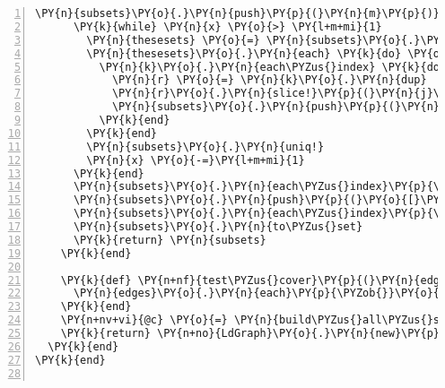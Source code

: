 \begin{Verbatim}[commandchars=\\\{\},numbers=left,firstnumber=1,stepnumber=1,xleftmargin=7mm, fontsize=\small]
      \PY{n}{subsets}\PY{o}{.}\PY{n}{push}\PY{p}{(}\PY{n}{m}\PY{p}{)}
      \PY{k}{while} \PY{n}{x} \PY{o}{>} \PY{l+m+mi}{1}
        \PY{n}{thesesets} \PY{o}{=} \PY{n}{subsets}\PY{o}{.}\PY{n}{select}\PY{p}{\PYZob{}}\PY{o}{|}\PY{n}{k}\PY{o}{|} \PY{n}{k}\PY{o}{.}\PY{n}{length} \PY{o}{==} \PY{n}{x}\PY{p}{\PYZcb{}}
        \PY{n}{thesesets}\PY{o}{.}\PY{n}{each} \PY{k}{do} \PY{o}{|}\PY{n}{k}\PY{o}{|}
          \PY{n}{k}\PY{o}{.}\PY{n}{each\PYZus{}index} \PY{k}{do} \PY{o}{|}\PY{n}{j}\PY{o}{|}
            \PY{n}{r} \PY{o}{=} \PY{n}{k}\PY{o}{.}\PY{n}{dup}
            \PY{n}{r}\PY{o}{.}\PY{n}{slice!}\PY{p}{(}\PY{n}{j}\PY{p}{)}
            \PY{n}{subsets}\PY{o}{.}\PY{n}{push}\PY{p}{(}\PY{n}{r}\PY{p}{)}
          \PY{k}{end}
        \PY{k}{end}
        \PY{n}{subsets}\PY{o}{.}\PY{n}{uniq!}
        \PY{n}{x} \PY{o}{-=}\PY{l+m+mi}{1}
      \PY{k}{end}
      \PY{n}{subsets}\PY{o}{.}\PY{n}{each\PYZus{}index}\PY{p}{\PYZob{}}\PY{o}{|}\PY{n}{k}\PY{o}{|} \PY{k}{if} \PY{n}{k}\PY{o}{>}\PY{l+m+mi}{1} \PY{k}{then} \PY{n}{subsets}\PY{o}{[}\PY{n}{k}\PY{o}{]}\PY{o}{.}\PY{n}{push}\PY{p}{(}\PY{n+nv+vi}{@id}\PY{p}{)} \PY{k}{end}\PY{p}{\PYZcb{}}
      \PY{n}{subsets}\PY{o}{.}\PY{n}{push}\PY{p}{(}\PY{o}{[}\PY{n+nv+vi}{@id}\PY{o}{]}\PY{p}{)}
      \PY{n}{subsets}\PY{o}{.}\PY{n}{each\PYZus{}index}\PY{p}{\PYZob{}}\PY{o}{|}\PY{n}{k}\PY{o}{|} \PY{n}{subsets}\PY{o}{[}\PY{n}{k}\PY{o}{]} \PY{o}{=} \PY{n}{subsets}\PY{o}{[}\PY{n}{k}\PY{o}{]}\PY{o}{.}\PY{n}{to\PYZus{}set}\PY{p}{\PYZcb{}}
      \PY{n}{subsets}\PY{o}{.}\PY{n}{to\PYZus{}set}
      \PY{k}{return} \PY{n}{subsets}
    \PY{k}{end}
    
    \PY{k}{def} \PY{n+nf}{test\PYZus{}cover}\PY{p}{(}\PY{n}{edges}\PY{p}{,} \PY{n}{cover}\PY{p}{)}
      \PY{n}{edges}\PY{o}{.}\PY{n}{each}\PY{p}{\PYZob{}}\PY{o}{|}\PY{n}{k}\PY{o}{|} \PY{k}{return} \PY{k+kp}{false} \PY{k}{if} \PY{n}{cover}\PY{o}{-}\PY{n}{k} \PY{o}{==} \PY{n}{cover}\PY{p}{\PYZcb{}} 
    \PY{k}{end}
    \PY{n+nv+vi}{@c} \PY{o}{=} \PY{n}{build\PYZus{}all\PYZus{}subsets}\PY{o}{.}\PY{n}{select}\PY{p}{\PYZob{}}\PY{o}{|}\PY{n}{k}\PY{o}{|} \PY{n}{test\PYZus{}cover}\PY{p}{(}\PY{n}{alledges}\PY{p}{,} \PY{n}{k}\PY{p}{)}\PY{p}{\PYZcb{}}\PY{o}{.}\PY{n}{to\PYZus{}set}
    \PY{k}{return} \PY{n+no}{LdGraph}\PY{o}{.}\PY{n}{new}\PY{p}{(}\PY{n+nv+vi}{@c}\PY{p}{,} \PY{n}{nodes}\PY{p}{)}
  \PY{k}{end}  
\PY{k}{end}


\end{Verbatim}

